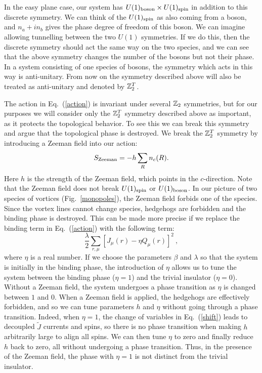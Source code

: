 In the easy plane case, our system has $U(1)_{\rm boson}\times U(1)_{\rm spin}$ in addition to this discrete symmetry. We can think of the $U(1)_{\rm spin}$ as also coming from a boson, and $n_a+i n_b$ gives the phase degree of freedom of this boson. We can imagine allowing tunnelling between the two $U(1)$ symmetries. If we do this, then the discrete symmetry should act the same way on the two species, and we can see that the above symmetry changes the number of the bosons but not their phase. In a system consisting of one species of bosons, the symmetry which acts in this way is anti-unitary.
From now on the symmetry described above will also be treated as anti-unitary and denoted by $\mathbb{Z}_2^T$.

The action in Eq.~(\ref{action}) is invariant under several $\mathbb{Z}_2$ symmetries, but for our purposes we will consider only the $\mathbb{Z}_2^T$ symmetry described above as important, as it protects the topological behavior. To see this we can break this symmetry and argue that the topological phase is destroyed.
We break the $\mathbb{Z}_2^T$ symmetry by introducing a Zeeman field into our action:
\begin{equation}
S_{\rm Zeeman}=-h\sum_R n_c(R).
\label{Zeeman}
\end{equation}
Here $h$ is the strength of the Zeeman field, which points in the $c$-direction. Note that the Zeeman field does not break $U(1)_{\rm spin}$ or $U(1)_{\rm boson}$. In our picture of two species of vortices (Fig.~\ref{monopoles}), the Zeeman field forbids one of the species. Since the vortex lines cannot change species, hedgehogs are forbidden and the binding phase is destroyed. 
This can be made more precise if we replace the binding term in Eq.~(\ref{action}) with the following term:
\begin{equation}
\frac{\lambda}{2}\sum_{r,\mu} [ J_\mu(r) - \eta Q_\mu(r)]^2 ~,
\label{tbind}
\end{equation}
where $\eta$ is a real number. If we choose the parameters $\beta$ and $\lambda$ so that the system is initially in the binding phase, the introduction of $\eta$ allows us to tune the system between the binding phase ($\eta=1$) and the trivial insulator ($\eta=0$). Without a Zeeman field, the system undergoes a phase transition as $\eta$ is changed between $1$ and $0$. 
When a Zeeman field is applied, the hedgehogs are effectively forbidden, and so we can tune parameters $h$ and $\eta$ without going through a phase transition. Indeed, when $\eta=1$, the change of variables in Eq.~(\ref{shift}) leads to decoupled $\tilde{J}$ currents and spins, so there is no phase transition when making $h$ arbitrarily large to align all spins. We can then tune $\eta$ to zero and finally reduce $h$ back to zero, all without undergoing a phase transition.  Thus, in the presence of the Zeeman field, the phase with $\eta=1$ is not distinct from the trivial insulator.


